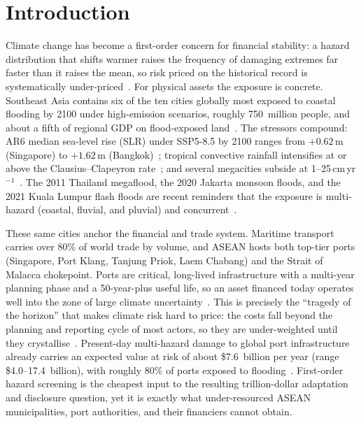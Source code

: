 \documentclass[11pt,a4paper]{article}
\begin{document}
\section{Introduction}
Climate change has become a first-order concern for financial stability: a hazard distribution that shifts warmer raises the frequency of damaging extremes far faster than it raises the mean, so risk priced on the historical record is systematically under-priced~\cite{carney2015,ngfs2021}. For physical assets the exposure is concrete. Southeast Asia contains six of the ten cities globally most exposed to coastal flooding by 2100 under high-emission scenarios, roughly 750~million people, and about a fifth of regional GDP on flood-exposed land~\cite{adb2022}. The stressors compound: AR6 median sea-level rise (SLR) under SSP5-8.5 by 2100 ranges from $+0.62$\,m (Singapore) to $+1.62$\,m (Bangkok)~\cite{ar6}; tropical convective rainfall intensifies at or above the Clausius--Clapeyron rate~\cite{lenderink2017}; and several megacities subside at 1--25\,cm\,yr$^{-1}$~\cite{chaussard2013,abidin2011,phienwej2006}. The 2011 Thailand megaflood, the 2020 Jakarta monsoon floods, and the 2021 Kuala Lumpur flash floods are recent reminders that the exposure is multi-hazard (coastal, fluvial, and pluvial) and concurrent~\cite{hallegatte2013,tellman2021}.

These same cities anchor the financial and trade system. Maritime transport carries over 80\% of world trade by volume, and ASEAN hosts both top-tier ports (Singapore, Port Klang, Tanjung Priok, Laem Chabang) and the Strait of Malacca chokepoint. Ports are critical, long-lived infrastructure with a multi-year planning phase and a 50-year-plus useful life, so an asset financed today operates well into the zone of large climate uncertainty~\cite{hanson2020}. This is precisely the ``tragedy of the horizon'' that makes climate risk hard to price: the costs fall beyond the planning and reporting cycle of most actors, so they are under-weighted until they crystallise~\cite{carney2015}. Present-day multi-hazard damage to global port infrastructure already carries an expected value at risk of about \$7.6~billion per year (range \$4.0--17.4~billion), with roughly 80\% of ports exposed to flooding~\cite{verschuur2023}. First-order hazard screening is the cheapest input to the resulting trillion-dollar adaptation and disclosure question, yet it is exactly what under-resourced ASEAN municipalities, port authorities, and their financiers cannot obtain.
\end{document}
